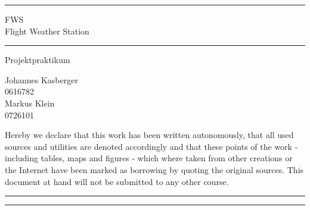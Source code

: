 \documentclass[a4paper,english,12pt,oneside]{memoir}
\newcommand\HRule{\noindent\rule{\linewidth}{1.5pt}}
\begin{document}
\begin{titlingpage}
    \HRule
    \begin{center}
        \LARGE FWS \\ 
        Flight Weather Station
    \end{center}
    \HRule
    \begin{center}
        \Large Projektpraktikum \\
        
     \end{center}
    \begin{center}
        \vspace{30pt}
        \normalsize Johannes Kasberger \\
        0616782 \\
        \vspace{15pt}
        Markus Klein \\
        0726101
     \end{center}
     \newpage
     
\noindent Hereby we declare that this work has been written autonomously, that all used sources and utilities are denoted accordingly and that these points of the work - including tables, maps and figures - which where taken from other creations or the Internet have been marked as borrowing by quoting the original sources. This document at hand will not be submitted to any other course.
\vspace*{30pt}
\noindent

\rule{0.3\textwidth}{0.4pt} \hspace{50pt} \rule{0.3\textwidth}{0.4pt}
 \end{titlingpage}

\tableofcontents
\newpage
\listoffigures
\listoftables








\end{document}
